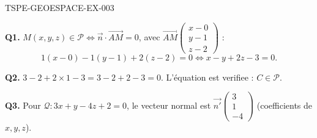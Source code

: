 \begin{corrige}{TSPE-GEOESPACE-EX-003}

\textbf{Q1.} $M(x,y,z) \in \mathcal{P} \iff \vec{n}\cdot\vec{AM}=0$, avec $\vec{AM}\begin{pmatrix}x-0\\y-1\\z-2\end{pmatrix}$ :
\[
  1(x-0)-1(y-1)+2(z-2)=0 \iff x-y+2z-3=0.
\]

\textbf{Q2.} $3-2+2\times1-3 = 3-2+2-3 = 0$. L'équation est verifiee : $C \in \mathcal{P}$.

\textbf{Q3.} Pour $\mathcal{Q}: 3x+y-4z+2=0$, le vecteur normal est $\vec{n'}\begin{pmatrix}3\\1\\-4\end{pmatrix}$ (coefficients de $x,y,z$).

\end{corrige}
